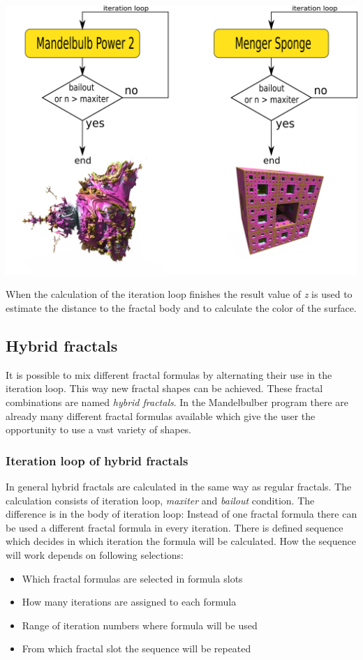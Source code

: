 \includegraphics[width=\linewidth]{img/manual/media/iteration_loops.png}

When the calculation of the iteration loop finishes the result value of \emph{z} is
used to estimate the distance to the fractal body and to calculate the color of the surface.

\subsection{Hybrid fractals}

It is possible to mix different fractal formulas by alternating their use in the iteration loop.
This way new fractal shapes can be achieved. These fractal combinations are named \emph{hybrid fractals}. 
In the Mandelbulber program there are already many different fractal formulas available which give the user 
the opportunity to use a vast variety of shapes.

\subsubsection{Iteration loop of hybrid fractals}

In general hybrid fractals are calculated in the same way as regular fractals.
The calculation consists of iteration loop, \emph{maxiter} and \emph{bailout} condition. The
difference is in the body of iteration loop: Instead of one fractal formula there
can be used a different fractal formula in every iteration. There is defined
sequence which decides in which iteration the formula will be calculated. How
the sequence will work depends on following selections: \begin{itemize} \item
	Which fractal formulas are selected in formula slots \item How many iterations
	are assigned to each formula \item Range of iteration numbers where formula will
	be used \item From which fractal slot the sequence will be repeated
\end{itemize}

